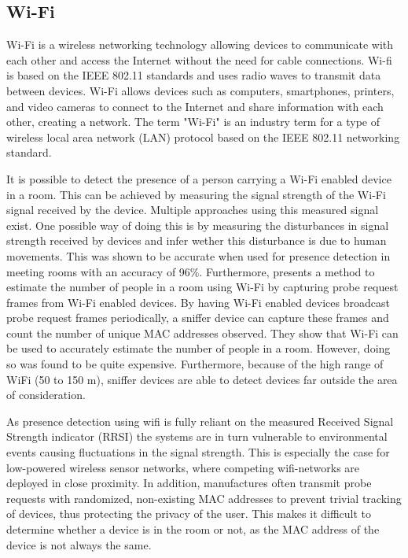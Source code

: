 \subsection{Wi-Fi} \label{sec:wi-fi}
Wi-Fi is a wireless networking technology allowing devices to communicate with each other and access the Internet without the need for cable connections. 
Wi-fi is based on the IEEE 802.11\cite{IEEE80211} standards and uses radio waves to transmit data between devices.
Wi-Fi allows devices such as computers, smartphones, printers, and video cameras to connect to the Internet and share information with each other, creating a network.
The term "Wi-Fi" is an industry term for a type of wireless local area network (LAN) protocol based on the IEEE 802.11 networking standard.\cite{WiFiAllianceDiscover,CiscoWhatIsWiFi}

It is possible to detect the presence of a person carrying a Wi-Fi enabled device in a room.
This can be achieved by measuring the signal strength of the Wi-Fi signal received by the device.
Multiple approaches using this measured signal exist. 
One possible way of doing this is by measuring the disturbances in signal strength received by devices and infer wether this disturbance is due to human movements. 
This was shown to be accurate when used for presence detection in meeting rooms with an accuracy of 96\%. \cite{wifi_presence_detection_df}
Furthermore,\citeauthor{longoAccurateOccupancyEstimation2019}\cite{longoAccurateOccupancyEstimation2019} presents a method to estimate the number of people in a room using Wi-Fi by capturing probe request frames from Wi-Fi enabled devices.
By having Wi-Fi enabled devices broadcast probe request frames periodically, a sniffer device can capture these frames and count the number of unique MAC addresses observed.
They show that Wi-Fi can be used to accurately estimate the number of people in a room.
However, doing so was found to be quite expensive.
Furthermore, because of the high range of WiFi (50 to 150 m), sniffer devices are able to detect devices far outside the area of consideration.\cite{longoAccurateOccupancyEstimation2019}

As presence detection using wifi is fully reliant on the measured Received Signal Strength indicator (RRSI) the systems are in turn vulnerable to environmental events causing fluctuations in the signal strength.
This is especially the case for low-powered wireless sensor networks, where competing wifi-networks are deployed in close proximity.\cite{competing_wifi}
In addition, manufactures often transmit probe requests with randomized, non-existing MAC addresses to prevent trivial tracking of devices, thus protecting the privacy of the user.
This makes it difficult to determine whether a device is in the room or not, as the MAC address of the device is not always the same.\cite{longoAccurateOccupancyEstimation2019}